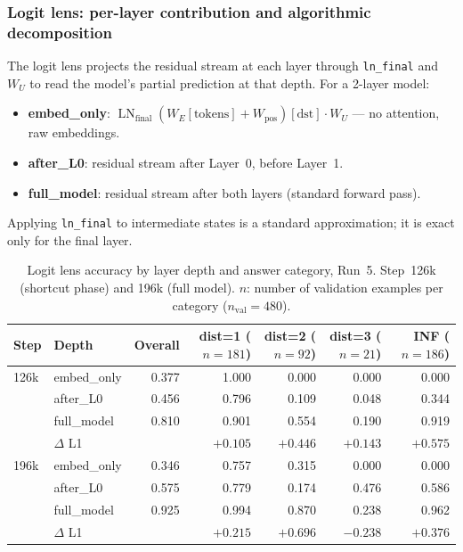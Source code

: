 \documentclass[11pt, a4paper]{article}
\DeclareMathOperator{\LN}{LN}
\begin{document}
\subsubsection{Logit lens: per-layer contribution and algorithmic decomposition}
\label{sec:logit-lens}

The logit lens \citep{nostalgebraist2020} projects the residual stream at
each layer through \texttt{ln\_final} and $W_U$ to read the model's partial
prediction at that depth.  For a 2-layer model:

\begin{itemize}[noitemsep]
  \item \textbf{embed\_only}: $\LN_{\text{final}}(W_E[\text{tokens}] +
    W_{\text{pos}})[\text{dst}] \cdot W_U$ --- no attention, raw embeddings.
  \item \textbf{after\_L0}: residual stream after Layer~0, before Layer~1.
  \item \textbf{full\_model}: residual stream after both layers (standard
    forward pass).
\end{itemize}

Applying \texttt{ln\_final} to intermediate states is a standard
approximation; it is exact only for the final layer.

\begin{table}[H]
\centering
\caption{Logit lens accuracy by layer depth and answer category, Run~5.
  Step~126k (shortcut phase) and 196k (full model).  $n$: number of validation
  examples per category ($n_{\text{val}}=480$).}
\label{tab:logit-lens}
\begin{tabular}{@{}llrrrrr@{}}
\toprule
Step & Depth & Overall & dist=1 ($n{=}181$) & dist=2 ($n{=}92$) &
      dist=3 ($n{=}21$) & INF ($n{=}186$) \\
\midrule
126k & embed\_only  & 0.377 & 1.000 & 0.000 & 0.000 & 0.000 \\
     & after\_L0    & 0.456 & 0.796 & 0.109 & 0.048 & 0.344 \\
     & full\_model  & 0.810 & 0.901 & 0.554 & 0.190 & 0.919 \\
     & $\Delta$ L1  &       & $+0.105$ & $+0.446$ & $+0.143$ & $+0.575$ \\
\midrule
196k & embed\_only  & 0.346 & 0.757 & 0.315 & 0.000 & 0.000 \\
     & after\_L0    & 0.575 & 0.779 & 0.174 & 0.476 & 0.586 \\
     & full\_model  & 0.925 & 0.994 & 0.870 & 0.238 & 0.962 \\
     & $\Delta$ L1  &       & $+0.215$ & $\mathbf{+0.696}$ &
       $\mathbf{-0.238}$ & $+0.376$ \\
\bottomrule
\end{tabular}
\end{table}
\end{document}
